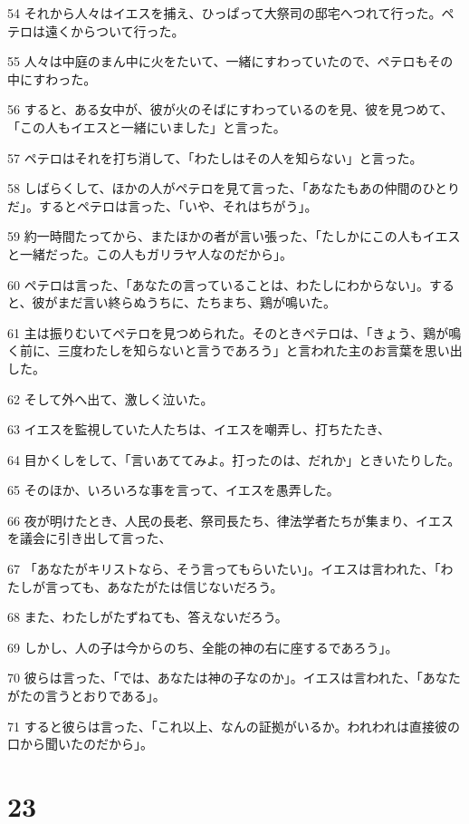 \par 54 それから人々はイエスを捕え、ひっぱって大祭司の邸宅へつれて行った。ペテロは遠くからついて行った。
\par 55 人々は中庭のまん中に火をたいて、一緒にすわっていたので、ペテロもその中にすわった。
\par 56 すると、ある女中が、彼が火のそばにすわっているのを見、彼を見つめて、「この人もイエスと一緒にいました」と言った。
\par 57 ペテロはそれを打ち消して、「わたしはその人を知らない」と言った。
\par 58 しばらくして、ほかの人がペテロを見て言った、「あなたもあの仲間のひとりだ」。するとペテロは言った、「いや、それはちがう」。
\par 59 約一時間たってから、またほかの者が言い張った、「たしかにこの人もイエスと一緒だった。この人もガリラヤ人なのだから」。
\par 60 ペテロは言った、「あなたの言っていることは、わたしにわからない」。すると、彼がまだ言い終らぬうちに、たちまち、鶏が鳴いた。
\par 61 主は振りむいてペテロを見つめられた。そのときペテロは、「きょう、鶏が鳴く前に、三度わたしを知らないと言うであろう」と言われた主のお言葉を思い出した。
\par 62 そして外へ出て、激しく泣いた。
\par 63 イエスを監視していた人たちは、イエスを嘲弄し、打ちたたき、
\par 64 目かくしをして、「言いあててみよ。打ったのは、だれか」ときいたりした。
\par 65 そのほか、いろいろな事を言って、イエスを愚弄した。
\par 66 夜が明けたとき、人民の長老、祭司長たち、律法学者たちが集まり、イエスを議会に引き出して言った、
\par 67 「あなたがキリストなら、そう言ってもらいたい」。イエスは言われた、「わたしが言っても、あなたがたは信じないだろう。
\par 68 また、わたしがたずねても、答えないだろう。
\par 69 しかし、人の子は今からのち、全能の神の右に座するであろう」。
\par 70 彼らは言った、「では、あなたは神の子なのか」。イエスは言われた、「あなたがたの言うとおりである」。
\par 71 すると彼らは言った、「これ以上、なんの証拠がいるか。われわれは直接彼の口から聞いたのだから」。

\chapter{23}


